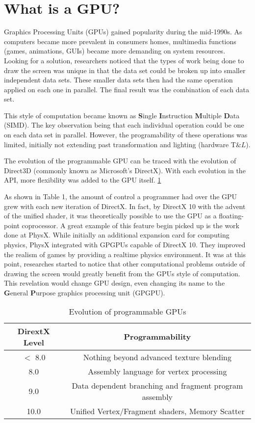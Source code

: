 \section*{What is a GPU?}

Graphics Processing Units (GPUs) gained popularity during the mid-1990s. As computers became more prevalent in consumers homes, multimedia functions (games, animations, GUIs) became more demanding on system resources. Looking for a solution, researchers noticed that the types of work being done to draw the screen was unique in that the data set could be broken up into smaller independent data sets. These smaller data sets then had the same operation applied on each one in parallel. The final result was the combination of each data set. 

This style of computation became known as \textbf{S}ingle \textbf{I}nstruction \textbf{M}ultiple \textbf{D}ata (SIMD). The key observation being that each individual operation could be one on each data set in parallel. However, the programability of these operations was limited, initially not extending past transformation and lighting (hardware T$\&L$). 

The evolution of the programmable GPU can be traced with the evolution of Direct3D (commonly known as Microsoft's DirectX). With each evolution in the API, more flexibility was added to the GPU itself. \ref{tab:gpuevolution}

As shown in Table 1, the amount of control a programmer had over the GPU grew with each new iteration of DirectX. In fact, by DirectX 10 with the advent of the unified shader, it was theoretically possible to use the GPU as a floating-point coprocessor. A great example of this feature begin picked up is the work done at PhysX. While initially an additional expansion card for computing physics, PhysX integrated with GPGPUs capable of DirectX 10. They improved the realism of games by providing a realtime physics environment. It was at this point, researches started to notice that other computational problems outside of drawing the screen would greatly benefit from the GPUs style of computation. This revelation would change GPU design, even changing its name to the \textbf{G}eneral \textbf{P}urpose graphics processing unit (GPGPU). \cite{emergingtech}

\begin{table}
	\begin{tabular}{|c|c|}
		\hline
		\textbf{DirextX Level} & \textbf{Programmability} \\
		\hline
		$<$ 8.0 & Nothing beyond advanced texture blending \\
		8.0 & Assembly language for vertex processing \\
		9.0 & Data dependent branching and fragment program assembly\\
		10.0 & Unified Vertex/Fragment shaders, Memory Scatter \\
		\hline
	\end{tabular}
	\caption{Evolution of programmable GPUs}
	\label{tab:gpuevolution}
\end{table}


